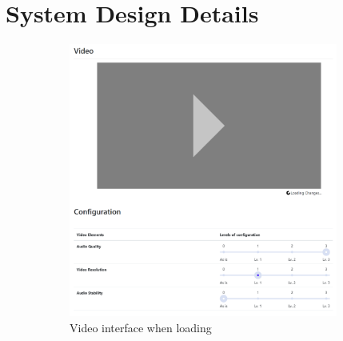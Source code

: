 \section{System Design Details}

\begin{figure}
     \centering
     \begin{subfigure}[ht]{0.49\textwidth}
         \centering
         \vspace*{0.065in}
         \includegraphics[width=0.97\textwidth]{content/image/player_loading.png}
         \caption{Video interface when loading}
         \label{fig:video_loading}
     \end{subfigure}
     \hfill
     \begin{subfigure}[ht]{0.49\textwidth}
         \centering

\end{subfigure}
\end{figure}
